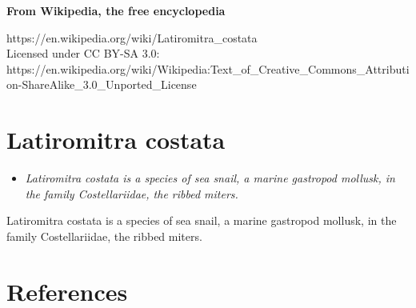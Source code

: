 \textbf{From Wikipedia, the free encyclopedia}

https://en.wikipedia.org/wiki/Latiromitra\_costata\\
Licensed under CC BY-SA 3.0:\\
https://en.wikipedia.org/wiki/Wikipedia:Text\_of\_Creative\_Commons\_Attribution-ShareAlike\_3.0\_Unported\_License

\section{Latiromitra costata}\label{latiromitra-costata}

\begin{itemize}
\item
  \emph{Latiromitra costata is a species of sea snail, a marine
  gastropod mollusk, in the family Costellariidae, the ribbed miters.}
\end{itemize}

Latiromitra costata is a species of sea snail, a marine gastropod
mollusk, in the family Costellariidae, the ribbed miters.

\section{References}\label{references}
